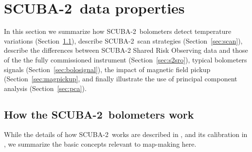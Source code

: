 \documentclass[useAMS,usenatbib,nofootinbib]{mn2e}
\newcommand{\scuba}{SCUBA-2}
\begin{document}


\section{\scuba\ data properties}
\label{sec:data}

In this section we summarize how \scuba\ bolometers detect temperature
variations (Section~\ref{sec:bolos}), describe \scuba\ scan strategies
(Section~\ref{sec:scan}), describe the differences between SCUBA-2
Shared Risk Observing data and those of the the fully commissioned
instrument (Section~\ref{sec:s2sro}), typical bolometers signals
(Section~\ref{sec:bolosignal}), the impact of magnetic field pickup
(Section~\ref{sec:magpickup}, and finally illustrate the use of
principal component analysis (Section~\ref{sec:pca}).

\subsection{How the \scuba\ bolometers work}
\label{sec:bolos}

While the details of how \scuba\ works are described in
\citet{holland2012}, and its calibration in \citet{dempsey2012}, we
summarize the basic concepts relevant to map-making here.
\end{document}
